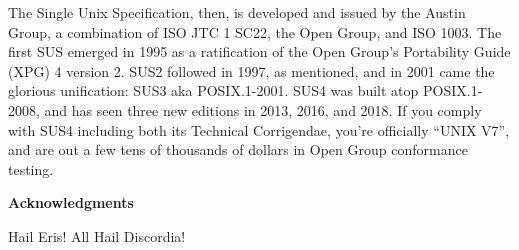 \documentclass[letterpaper,10pt]{article}
\begin{document}
\begin{appendices}
The Single Unix Specification, then, is developed and issued by the Austin
Group, a combination of ISO JTC 1 SC22, the Open Group, and ISO 1003. The first
SUS emerged in 1995 as a ratification of the Open Group's Portability Guide (XPG)
4 version 2. SUS2 followed in 1997, as mentioned, and in 2001 came the glorious
unification: SUS3 aka POSIX.1-2001. SUS4 was built atop POSIX.1-2008, and has
seen three new editions in 2013, 2016, and 2018. If you comply with SUS4 including
both its Technical Corrigendae, you're officially ``UNIX V7'', and are out a few
tens of thousands of dollars in Open Group conformance testing.

\cleardoublepage

%

\end{appendices}
\cleardoublepage
\glsaddallunused
\printglossary[title={Glossary of terms}]
\cleardoublepage
\printbibliography
{}
\cleardoublepage
\vspace*{.5in}
\begin{center}\textbf{Acknowledgments}\end{center}
Hail Eris! All Hail Discordia!
\end{document}
